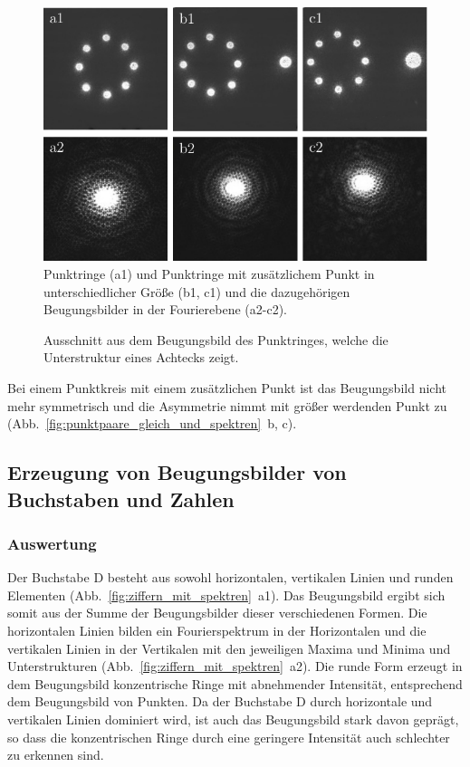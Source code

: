 \begin{figure}[h]
	\centering
	\includegraphics{images/Regina/abb17.pdf}
	\caption[Punktringe mit Fourierspektren]{
		Punktringe (a1) und Punktringe mit zusätzlichem Punkt in unterschiedlicher Größe (b1, c1) und die dazugehörigen Beugungsbilder in der Fourierebene (a2-c2).
	}
	\label{fig:punktringe_und_spektrum}
\end{figure}

\begin{figure}[h]
	\centering
	\caption[Beugungsbild der Punktringe mit vergrößertem Ausschnitt]{
		Ausschnitt aus dem Beugungsbild des Punktringes, welche die Unterstruktur eines Achtecks zeigt.
	}
	\label{fig:punktringe_ausschnitt}
\end{figure}

Bei einem Punktkreis mit einem zusätzlichen Punkt ist das Beugungsbild nicht mehr symmetrisch und die Asymmetrie nimmt mit größer werdenden Punkt zu (Abb.~\ref{fig:punktpaare_gleich_und_spektren}~b, c).


\subsection{Erzeugung von Beugungsbilder von Buchstaben und Zahlen}
\subsubsection*{Auswertung}

Der Buchstabe D besteht aus sowohl horizontalen, vertikalen Linien und runden Elementen (Abb.~\ref{fig:ziffern_mit_spektren}~a1). Das Beugungsbild ergibt sich somit aus der Summe der Beugungsbilder dieser verschiedenen Formen. Die horizontalen Linien bilden ein Fourierspektrum in der Horizontalen und die vertikalen Linien in der Vertikalen mit den jeweiligen Maxima und Minima und Unterstrukturen (Abb.~\ref{fig:ziffern_mit_spektren}~a2). Die runde Form erzeugt in dem Beugungsbild konzentrische Ringe mit abnehmender Intensität, entsprechend dem Beugungsbild von Punkten. Da der Buchstabe D durch horizontale und vertikalen Linien dominiert wird, ist auch das Beugungsbild stark davon geprägt, so dass die konzentrischen Ringe durch eine geringere Intensität auch schlechter zu erkennen sind.

